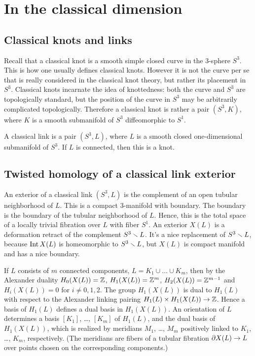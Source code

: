 \documentclass{article}
\numberwithin{equation}{section}
\begin{document}
\section{In the classical dimension}\label{s2}

\subsection{Classical knots and links}\label{s2.1} 
Recall that a {\sfit classical knot\/} is a smooth simple closed 
curve in the 3-sphere $S^3$. This is how one usually defines 
classical knots. However it is not the curve per se that 
is really considered in the classical knot theory, but
rather its placement in $S^3$. Classical knots incarnate the
idea of knottedness: both the curve and $S^3$ are topologically 
standard, but the position of the curve in $S^3$ may be
arbitrarily complicated topologically.
Therefore a classical knot 
is rather a pair $(S^3,K)$, where $K$ is a smooth
submanifold of $S^3$ diffeomorphic to $S^1$.            

A {\sfit classical link\/} is a pair $(S^3,L)$, 
where $L$ is a smooth closed one-dimensional submanifold 
of $S^3$. If $L$ is connected, then this is a knot.  

\subsection{Twisted homology of a classical link 
exterior}\label{s2.2}
An {\sfit exterior\/} of a classical link $(S^3,L)$ is the complement 
of an open tubular neighborhood of $L$. This is a compact 3-manifold
with boundary. The boundary is the boundary of the tubular neighborhood
of $L$. Hence, this is the total space of a locally trivial fibration 
over $L$ with fiber $S^1$. An exterior $X(L)$ is a deformation retract
of the complement $S^3\smallsetminus L$. It's a nice replacement of 
$S^3\smallsetminus L$, because $\operatorname{Int} X(L)$ is homeomorphic to 
$S^3\smallsetminus L$, but $X(L)$ is compact manifold and has a nice boundary.

If $L$ consists of $m$ connected components, $L=K_1\cup\dots\cup K_m$,
then by the Alexander duality $H_0(X(L))=\mathbb Z$, $H_1(X(L))=\mathbb Z^m$, 
$H_2(X(L))=\mathbb Z^{m-1}$ 
and $H_i(X(L))=0$ for $i\ne 0,1,2$. The group $H_1(X(L))$ is dual to 
$H_1(L)$ with respect to the Alexander linking pairing 
$H_1(L)\times H_1(X(L))\to\mathbb Z$.  Hence a basis of $H_1(L)$ defines a dual
basis in $H_1(X(L))$. An orientation of $L$ determines a basis
$[K_1]$, \dots, $[K_m]$ of $H_1(L)$, and the dual basis of $H_1(X(L))$, 
which is realized by meridians $M_1$, \dots, $M_m$ positively linked 
to $K_1$, \dots, $K_m$, respectively. (The meridians are fibers of a
tubular fibration $\partial X(L)\to L$ over points chosen on the corresponding
components.)
 
\end{document}
